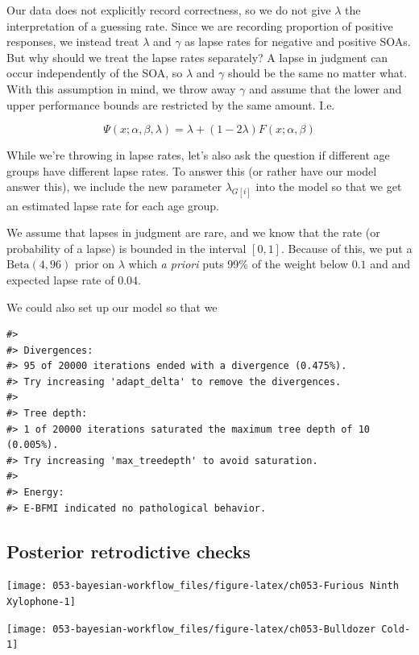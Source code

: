 \documentclass[11pt, oneside, openany]{scrbook}
\begin{document}
Our data does not explicitly record correctness, so we do not give \(\lambda\) the interpretation of a guessing rate. Since we are recording proportion of positive responses, we instead treat \(\lambda\) and \(\gamma\) as lapse rates for negative and positive SOAs. But why should we treat the lapse rates separately? A lapse in judgment can occur independently of the SOA, so \(\lambda\) and \(\gamma\) should be the same no matter what. With this assumption in mind, we throw away \(\gamma\) and assume that the lower and upper performance bounds are restricted by the same amount. I.e.

\[
\Psi(x; \alpha, \beta, \lambda) = \lambda + (1 - 2\lambda) F(x; \alpha, \beta)
\]

While we're throwing in lapse rates, let's also ask the question if different age groups have different lapse rates. To answer this (or rather have our model answer this), we include the new parameter \(\lambda_{G[i]}\) into the model so that we get an estimated lapse rate for each age group.

We assume that lapses in judgment are rare, and we know that the rate (or probability of a lapse) is bounded in the interval \([0, 1]\). Because of this, we put a \(\mathrm{Beta(4, 96)}\) prior on \(\lambda\) which \emph{a priori} puts 99\% of the weight below \(0.1\) and and expected lapse rate of \(0.04\).

We could also set up our model so that we

\begin{verbatim}
#> 
#> Divergences:
#> 95 of 20000 iterations ended with a divergence (0.475%).
#> Try increasing 'adapt_delta' to remove the divergences.
#> 
#> Tree depth:
#> 1 of 20000 iterations saturated the maximum tree depth of 10 (0.005%).
#> Try increasing 'max_treedepth' to avoid saturation.
#> 
#> Energy:
#> E-BFMI indicated no pathological behavior.
\end{verbatim}

\hypertarget{posterior-retrodictive-checks}{%
\subsection{Posterior retrodictive checks}\label{posterior-retrodictive-checks}}

\begin{center}\texttt{[image: 053-bayesian-workflow\_files/figure-latex/ch053-Furious Ninth Xylophone-1]} \end{center}

\begin{center}\texttt{[image: 053-bayesian-workflow\_files/figure-latex/ch053-Bulldozer Cold-1]} \end{center}
\end{document}

